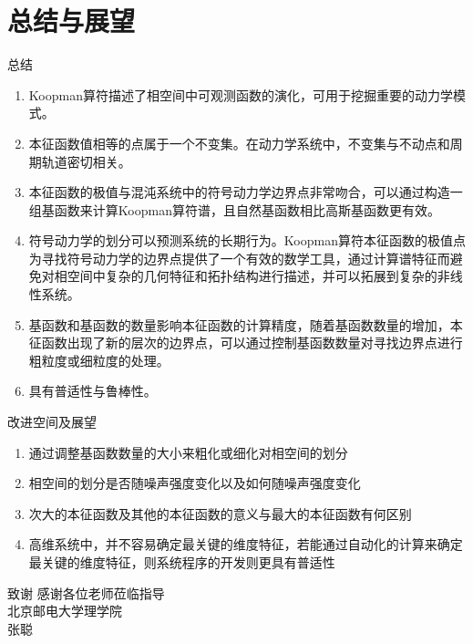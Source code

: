 \documentclass{beamer}
\begin{document}
\section{总结与展望}
\begin{frame}{总结}
	\begin{enumerate}
		\small
		\item Koopman算符描述了相空间中可观测函数的演化，可用于挖掘重要的动力学模式。
		\item 本征函数值相等的点属于一个不变集。在动力学系统中，不变集与不动点和周期轨道密切相关。
		\item 本征函数的极值与混沌系统中的符号动力学边界点非常吻合，可以通过构造一组基函数来计算Koopman算符谱，且自然基函数相比高斯基函数更有效。
		\item 符号动力学的划分可以预测系统的长期行为。Koopman算符本征函数的极值点为寻找符号动力学的边界点提供了一个有效的数学工具，通过计算谱特征而避免对相空间中复杂的几何特征和拓扑结构进行描述，并可以拓展到复杂的非线性系统。
		\item 基函数和基函数的数量影响本征函数的计算精度，随着基函数数量的增加，本征函数出现了新的层次的边界点，可以通过控制基函数数量对寻找边界点进行粗粒度或细粒度的处理。
		\item 具有普适性与鲁棒性。
	\end{enumerate}
\end{frame}
\begin{frame}{改进空间及展望}
	\begin{enumerate}
		\item 通过调整基函数数量的大小来粗化或细化对相空间的划分
		\item 相空间的划分是否随噪声强度变化以及如何随噪声强度变化
		\item 次大的本征函数及其他的本征函数的意义与最大的本征函数有何区别
		\item 高维系统中，并不容易确定最关键的维度特征，若能通过自动化的计算来确定最关键的维度特征，则系统程序的开发则更具有普适性
	\end{enumerate}
\end{frame}
\begin{frame}{致谢}
\centering
\huge 感谢各位老师莅临指导\\[30pt]
\normalsize 北京邮电大学理学院\\
张聪
\end{frame}
\end{document}
